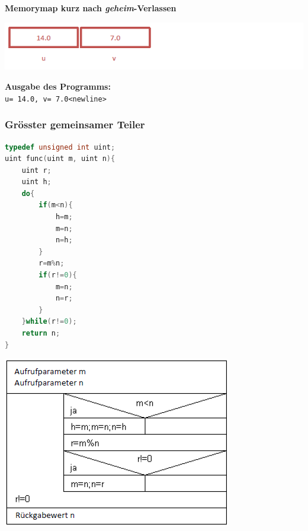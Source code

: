 			\textbf{Memorymap kurz nach \textit{geheim}-Verlassen}\\
				\begin{minipage}{0.9\linewidth}
					\includegraphics[width=1\linewidth]{Bilder/memmap-nach-verlassen.png}
				\end{minipage}

			\textbf{Ausgabe des Programms:}\\
				\verb*|u= 14.0, v= 7.0<newline>|

		\subsubsection{Grösster gemeinsamer Teiler}
			\begin{minipage}{0.45\linewidth}
				\begin{lstlisting}[language=C]
typedef unsigned int uint;
uint func(uint m, uint n){
	uint r;
	uint h;
	do{
		if(m<n){
			h=m;
			m=n;
			n=h;
		}
		r=m%n;
		if(r!=0){
			m=n;
			n=r;
		}
	}while(r!=0);
	return n;
}
				\end{lstlisting}
			\end{minipage}
			\hfill
			\begin{minipage}{0.5\linewidth}
				\includegraphics[width=1\linewidth]{Bilder/snippets-ggt.png}
			\end{minipage}